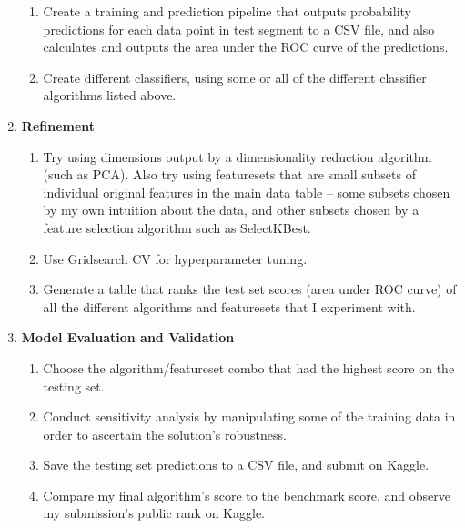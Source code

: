 \documentclass[12pt, letterpaper]{article}
\begin{document}
\begin{enumerate}
\begin{enumerate}
      \item Create a training and prediction pipeline that outputs probability predictions for each data point in test segment to a CSV file, and also calculates and outputs the area under the ROC curve of the predictions.
      \item Create different classifiers, using some or all of the different classifier algorithms listed above.
    \end{enumerate}
  \item \textbf{Refinement}
    \begin{enumerate}
      \item Try using dimensions output by a dimensionality reduction algorithm (such as PCA). Also try using featuresets that are small subsets of individual original features in the main data table --  some subsets chosen by my own intuition about the data, and other subsets chosen by a feature selection algorithm such as SelectKBest.
      \item Use Gridsearch CV for hyperparameter tuning.
      \item Generate a table that ranks the test set scores (area under ROC curve) of all the different algorithms and featuresets that I experiment with.
    \end{enumerate}
  \item \textbf{Model Evaluation and Validation}
    \begin{enumerate}
      \item Choose the algorithm/featureset combo that had the highest score on the testing set.
      \item Conduct sensitivity analysis by manipulating some of the training data in order to ascertain the solution's robustness.
      \item Save the testing set predictions to a CSV file, and submit on Kaggle.
      \item Compare my final algorithm's score to the benchmark score, and observe my submission's public rank on Kaggle.
    \end{enumerate}
\end{enumerate}

\renewcommand{\labelenumi}{\arabic{enumi}}
\end{document}
